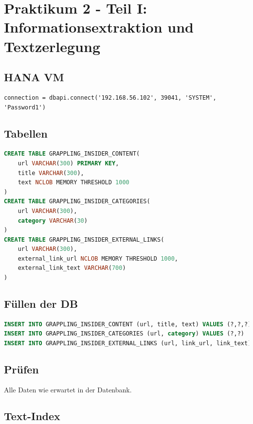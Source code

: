\newpage
\section{Praktikum 2 - Teil I: Informationsextraktion und Textzerlegung}

\subsection{HANA VM}

{\color{MidnightBlue}
\begin{lstlisting}
connection = dbapi.connect('192.168.56.102', 39041, 'SYSTEM', 'Password1')
\end{lstlisting}}

\subsection{Tabellen}

{\color{MidnightBlue}
\begin{lstlisting}[language=SQL]
CREATE TABLE GRAPPLING_INSIDER_CONTENT(
    url VARCHAR(300) PRIMARY KEY,
    title VARCHAR(300),
    text NCLOB MEMORY THRESHOLD 1000
)
CREATE TABLE GRAPPLING_INSIDER_CATEGORIES(
    url VARCHAR(300),
    category VARCHAR(30)
)
CREATE TABLE GRAPPLING_INSIDER_EXTERNAL_LINKS(
    url VARCHAR(300),
    external_link_url NCLOB MEMORY THRESHOLD 1000,
    external_link_text VARCHAR(700)
)
\end{lstlisting}}

\subsection{Füllen der DB}

{\color{MidnightBlue}
\begin{lstlisting}[language=SQL]
INSERT INTO GRAPPLING_INSIDER_CONTENT (url, title, text) VALUES (?,?,?)
INSERT INTO GRAPPLING_INSIDER_CATEGORIES (url, category) VALUES (?,?)
INSERT INTO GRAPPLING_INSIDER_EXTERNAL_LINKS (url, link_url, link_text) VALUES (?,?,?)
\end{lstlisting}}

\subsection{Prüfen}

Alle Daten wie erwartet in der Datenbank.

\subsection{Text-Index}

